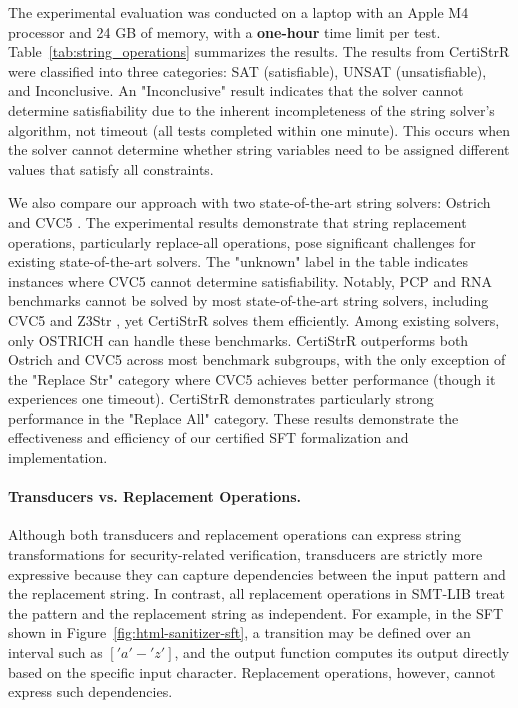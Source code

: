 The experimental evaluation was conducted on a laptop with an Apple M4 processor and 24 GB of memory, with a \textbf{one-hour} time limit per test. Table~\ref{tab:string_operations} summarizes the results. The results from CertiStrR were classified into three categories: SAT (satisfiable), UNSAT (unsatisfiable), and Inconclusive. An "Inconclusive" result indicates that the solver cannot determine satisfiability due to the inherent incompleteness of the string solver's algorithm, not timeout (all tests completed within one minute). This occurs when the solver cannot determine whether string variables need to be assigned different values that satisfy all constraints.

We also compare our approach with two state-of-the-art string solvers: Ostrich \cite{pacmpl/ChenFHHHKLRW22} and CVC5 \cite{cvc5}.
The experimental results demonstrate that string replacement operations, particularly replace-all operations, pose significant challenges for existing state-of-the-art solvers.
The "unknown" label in the table indicates instances where CVC5 cannot determine satisfiability. 
Notably, PCP and RNA benchmarks cannot be solved by most state-of-the-art string
solvers, including CVC5 \cite{cvc5} and Z3Str \cite{Z3-str3}, yet CertiStrR solves
them efficiently. Among existing solvers, only OSTRICH \cite{pacmpl/ChenFHHHKLRW22} can handle these benchmarks.
CertiStrR outperforms both Ostrich and CVC5 across most benchmark subgroups, with the only exception of the "Replace Str" category where CVC5 achieves better performance (though it experiences one timeout). CertiStrR demonstrates particularly strong performance in the "Replace All" category.
These results demonstrate the effectiveness and efficiency of our certified SFT formalization and implementation.

\paragraph{Transducers vs. Replacement Operations.}  
Although both transducers and replacement operations can express string transformations for security-related verification, transducers are strictly more expressive because they can capture dependencies between the input pattern and the replacement string. In contrast, all replacement operations in SMT-LIB treat the pattern and the replacement string as independent. For example, in the SFT shown in Figure~\ref{fig:html-sanitizer-sft}, a transition may be defined over an interval such as $['a'-'z']$, and the output function computes its output directly based on the specific input character. Replacement operations, however, cannot express such dependencies.  

